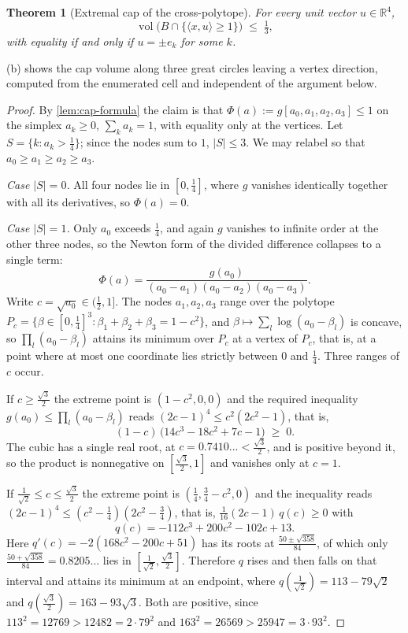 \documentclass[11pt,reqno]{amsart}
\renewcommand{\_}{\origunderscore\allowbreak}
\numberwithin{equation}{section}
\theoremstyle{plain}
\newtheorem{thm}{Theorem}[section]
\theoremstyle{definition}
\theoremstyle{remark}
\DeclareMathOperator{\vol}{vol}
\begin{document}
\begin{thm}[Extremal cap of the cross-polytope]\label{thm:cap-inequality}
For every unit vector $u\in\mathbb{R}^4$,
\[
  \vol\bigl(B\cap\{\langle x,u\rangle\ge1\}\bigr)\;\le\;\tfrac13,
\]
with equality if and only if $u=\pm e_k$ for some $k$.
\end{thm}

(b) shows the cap volume along three great circles
leaving a vertex direction, computed from the enumerated cell and
independent of the argument below.

\begin{proof}
By \cref{lem:cap-formula} the claim is that $\Phi(a):=g[a_0,a_1,a_2,a_3]\le1$
on the simplex $a_k\ge0$, $\sum_ka_k=1$, with equality only at the
vertices. Let $S=\{k:a_k>\tfrac14\}$; since the nodes sum to $1$,
$|S|\le3$. We may relabel so that $a_0\ge a_1\ge a_2\ge a_3$.

\emph{Case $|S|=0$.} All four nodes lie in $[0,\tfrac14]$, where $g$
vanishes identically together with all its derivatives, so $\Phi(a)=0$.

\emph{Case $|S|=1$.} Only $a_0$ exceeds $\tfrac14$, and again $g$ vanishes
to infinite order at the other three nodes, so the Newton form of the
divided difference collapses to a single term:
\[
  \Phi(a)=\frac{g(a_0)}{(a_0-a_1)(a_0-a_2)(a_0-a_3)} .
\]
Write $c=\sqrt{a_0}\in(\tfrac12,1]$. The nodes $a_1,a_2,a_3$ range over
the polytope $P_c=\{\beta\in[0,\tfrac14]^3:\beta_1+\beta_2+\beta_3=1-c^2\}$,
and $\beta\mapsto\sum_l\log(a_0-\beta_l)$ is concave, so
$\prod_l(a_0-\beta_l)$ attains its minimum over $P_c$ at a vertex of
$P_c$, that is, at a point where at most one coordinate lies strictly
between $0$ and $\tfrac14$. Three ranges of $c$ occur.

If $c\ge\tfrac{\sqrt3}{2}$ the extreme point is $(1-c^2,0,0)$ and the
required inequality $g(a_0)\le\prod_l(a_0-\beta_l)$ reads
$(2c-1)^4\le c^2(2c^2-1)$, that is,
\[
  (1-c)\,\bigl(14c^3-18c^2+7c-1\bigr)\;\ge\;0 .
\]
The cubic has a single real root, at $c=0.7410\ldots<\tfrac{\sqrt3}{2}$,
and is positive beyond it, so the product is nonnegative on
$[\tfrac{\sqrt3}{2},1]$ and vanishes only at $c=1$.

If $\tfrac{1}{\sqrt2}\le c\le\tfrac{\sqrt3}{2}$ the extreme point is
$(\tfrac14,\tfrac34-c^2,0)$ and the inequality reads
$(2c-1)^4\le(c^2-\tfrac14)(2c^2-\tfrac34)$, that is,
$\tfrac{1}{16}(2c-1)\,q(c)\ge0$ with
\[
  q(c)=-112c^3+200c^2-102c+13 .
\]
Here $q'(c)=-2(168c^2-200c+51)$ has its roots at
$\tfrac{50\pm\sqrt{358}}{84}$, of which only
$\tfrac{50+\sqrt{358}}{84}=0.8205\ldots$ lies in
$[\tfrac1{\sqrt2},\tfrac{\sqrt3}{2}]$. Therefore $q$ rises and then falls on
that interval and attains its minimum at an endpoint, where
$q(\tfrac1{\sqrt2})=113-79\sqrt2$ and $q(\tfrac{\sqrt3}{2})=163-93\sqrt3$.
Both are positive, since $113^2=12769>12482=2\cdot79^2$ and
$163^2=26569>25947=3\cdot93^2$.


\end{proof}
\end{document}
